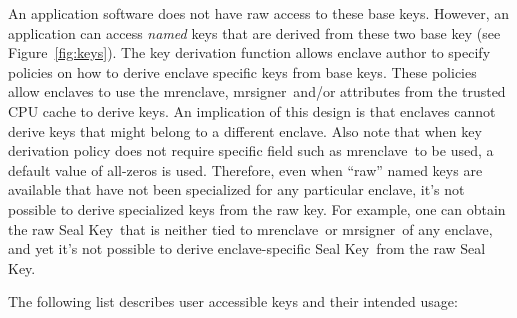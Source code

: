\documentclass[letterpaper]{article}
\newcommand{\mrenclave}{\textsf{mrenclave}}
\newcommand{\mrsigner}{\textsf{mrsigner}}
\newcommand{\sk}{\textsf{Seal Key}}
\begin{document}
  An application software does not have raw access to these base
  keys. However, an application can access \textit{named} keys that
  are derived from these two base key (see Figure~\ref{fig:keys}).
  The key derivation function allows enclave author to specify
  policies on how to derive enclave specific keys from base
  keys. These policies allow enclaves to use the \mrenclave,
  \mrsigner\ and/or attributes from the trusted CPU cache to derive
  keys. An implication of this design is that enclaves cannot derive
  keys that might belong to a different enclave. Also note that when
  key derivation policy does not require specific field such as
  \mrenclave\ to be used, a default value of all-zeros is
  used. Therefore, even when ``raw'' named keys are available that
  have not been specialized for any particular enclave, it's not
  possible to derive specialized keys from the raw key. For example,
  one can obtain the raw \sk\ that is neither tied to \mrenclave\ or
  \mrsigner\ of any enclave, and yet it's not possible to derive
  enclave-specific \sk\ from the raw \sk.

  The following list describes user accessible keys and their intended
  usage:
\end{document}
